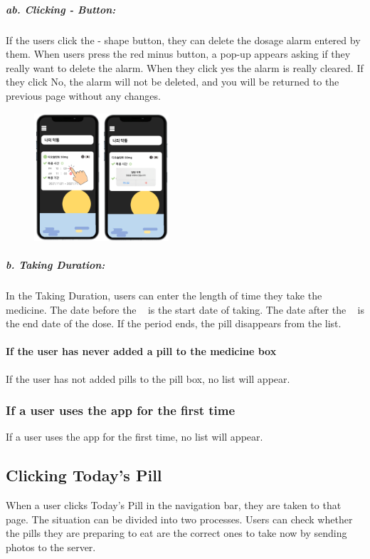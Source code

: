 \documentclass[conference]{IEEEtran}
\begin{document}
\subparagraph{ab. Clicking - Button: }
If the users click the - shape button, they can delete the dosage alarm entered by them. When users press the red minus button, a pop-up appears asking if they really want to delete the alarm. When they click yes the alarm is really cleared. If they click No, the alarm will not be deleted, and you will be returned to the previous page without any changes.\\

\begin{figure}[h!]
\centering
\includegraphics[width=5cm]{final_image_folder/click_pillbox_alarm_remove.png}
\caption{}
\label{fig:map}
\end{figure}

\subparagraph{b. Taking Duration: }
In the Taking Duration, users can enter the length of time they take the medicine. The date before the ~ is the start date of taking. The date after the ~ is the end date of the dose. If the period ends, the pill disappears from the list.\\

\paragraph{If the user has never added a pill to the medicine box}
If the user has not added pills to the pill box, no list will appear.\\

\subsubsection{If a user uses the app for the first time}
If a user uses the app for the first time, no list will appear.\\

\subsection{Clicking Today's Pill}
When a user clicks Today's Pill in the navigation bar, they are taken to that page. The situation can be divided into two processes. Users can check whether the pills they are preparing to eat are the correct ones to take now by sending photos to the server. \\
\end{document}
